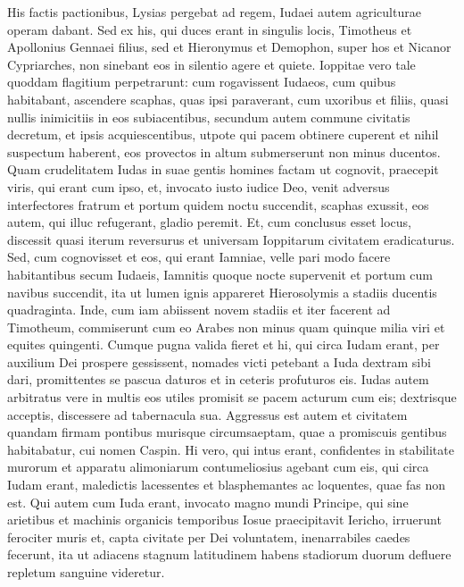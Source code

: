 \begin{biblechapter}
\begin{biblechapter}
\begin{biblechapter}
\begin{biblechapter}
\begin{biblechapter}
\begin{biblechapter}
\begin{biblechapter}
\begin{biblechapter}
\begin{biblechapter}
\begin{biblechapter}
\begin{biblechapter}
\begin{biblechapter}
\verse His factis pactionibus, Lysias pergebat ad regem, Iudaei autem agriculturae operam dabant. 
\verse Sed ex his, qui duces erant in singulis locis, Timotheus et Apollonius Gennaei filius, sed et Hieronymus et Demophon, super hos et Nicanor Cypriarches, non sinebant eos in silentio agere et quiete. 
\verse Ioppitae vero tale quoddam flagitium perpetrarunt: cum rogavissent Iudaeos, cum quibus habitabant, ascendere scaphas, quas ipsi paraverant, cum uxoribus et filiis, quasi nullis inimicitiis in eos subiacentibus, 
\verse secundum autem commune civitatis decretum, et ipsis acquiescentibus, utpote qui pacem obtinere cuperent et nihil suspectum haberent, eos provectos in altum submerserunt non minus ducentos. 
\verse Quam crudelitatem Iudas in suae gentis homines factam ut cognovit, praecepit viris, qui erant cum ipso, et, invocato iusto iudice Deo, 
 \verse venit adversus interfectores fratrum et portum quidem noctu succendit, scaphas exussit, eos autem, qui illuc refugerant, gladio peremit. 
\verse Et, cum conclusus esset locus, discessit quasi iterum reversurus et universam Ioppitarum civitatem eradicaturus. 
\verse Sed, cum cognovisset et eos, qui erant Iamniae, velle pari modo facere habitantibus secum Iudaeis, 
\verse Iamnitis quoque nocte supervenit et portum cum navibus succendit, ita ut lumen ignis appareret Hierosolymis a stadiis ducentis quadraginta.
 \verse Inde, cum iam abiissent novem stadiis et iter facerent ad Timotheum, commiserunt cum eo Arabes non minus quam quinque milia viri et equites quingenti. 
\verse Cumque pugna valida fieret et hi, qui circa Iudam erant, per auxilium Dei prospere gessissent, nomades victi petebant a Iuda dextram sibi dari, promittentes se pascua daturos et in ceteris profuturos eis. 
\verse Iudas autem arbitratus vere in multis eos utiles promisit se pacem acturum cum eis; dextrisque acceptis, discessere ad tabernacula sua. 
\verse Aggressus est autem et civitatem quandam firmam pontibus murisque circumsaeptam, quae a promiscuis gentibus habitabatur, cui nomen Caspin. 
\verse Hi vero, qui intus erant, confidentes in stabilitate murorum et apparatu alimoniarum contumeliosius agebant cum eis, qui circa Iudam erant, maledictis lacessentes et blasphemantes ac loquentes, quae fas non est. 
\verse Qui autem cum Iuda erant, invocato magno mundi Principe, qui sine arietibus et machinis organicis temporibus Iosue praecipitavit Iericho, irruerunt ferociter muris 
\verse et, capta civitate per Dei voluntatem, inenarrabiles caedes fecerunt, ita ut adiacens stagnum latitudinem habens stadiorum duorum defluere repletum sanguine videretur.

\end{biblechapter}
\end{biblechapter}
\end{biblechapter}
\end{biblechapter}
\end{biblechapter}
\end{biblechapter}
\end{biblechapter}
\end{biblechapter}
\end{biblechapter}
\end{biblechapter}
\end{biblechapter}
\end{biblechapter}
